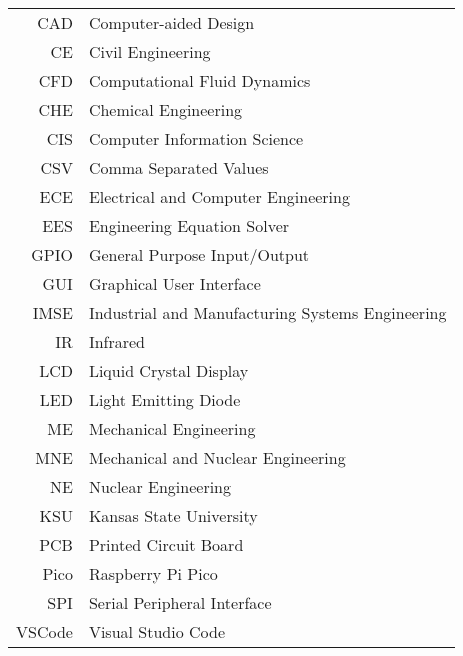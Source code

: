 \begin{tabular}{r p{}}
    CAD & Computer-aided Design \\
    CE & Civil Engineering \\
    CFD & Computational Fluid Dynamics \\
    CHE & Chemical Engineering \\
    CIS & Computer Information Science \\
    CSV & Comma Separated Values \\
    ECE & Electrical and Computer Engineering \\
    EES & Engineering Equation Solver \\
    GPIO & General Purpose Input/Output \\
    GUI & Graphical User Interface \\
    IMSE & Industrial and Manufacturing Systems Engineering \\
    IR & Infrared \\
    LCD & Liquid Crystal Display \\
    LED & Light Emitting Diode \\
    ME & Mechanical Engineering \\
    MNE & Mechanical and Nuclear Engineering \\
    NE & Nuclear Engineering \\
    KSU & Kansas State University \\
    PCB & Printed Circuit Board \\
    Pico & Raspberry Pi Pico \\
    SPI & Serial Peripheral Interface \\
    VSCode & Visual Studio Code
\end{tabular}\\